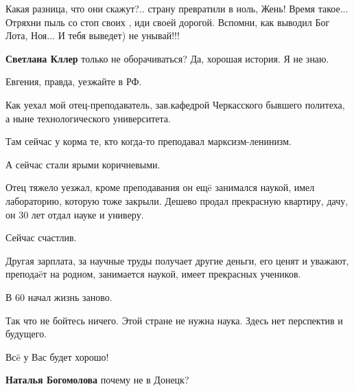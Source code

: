 \begin{itemize}
\begin{itemize}
Какая разница, что они скажут?.. страну превратили в ноль, Жень! Время такое...
Отряхни пыль со стоп своих , иди своей дорогой. Вспомни, как выводил Бог Лота,
Ноя... И тебя выведет) не унывай!!!

 
\textbf{Светлана Кллер} только не оборачиваться? Да, хорошая история. Я не знаю.
\end{itemize}

 

Евгения, правда, уезжайте в РФ.

Как уехал мой отец-преподаватель, зав.кафедрой Черкасского бывшего политеха, а
ныне технологического университета.

Там сейчас у корма те, кто когда-то преподавал марксизм-ленинизм.

А сейчас стали ярыми коричневыми.

Отец тяжело уезжал, кроме преподавания он ещë занимался наукой, имел
лабораторию, которую тоже закрыли. Дешево продал прекрасную квартиру, дачу, он
30 лет отдал науке и универу.

Сейчас счастлив.

Другая зарплата, за научные труды получает другие деньги, его ценят и уважают,
преподаëт на родном, занимается наукой, имеет прекрасных учеников.

В 60 начал жизнь заново.

Так что не бойтесь ничего. Этой стране не нужна наука. Здесь нет перспектив и
будущего.

Всë у Вас будет хорошо!

\begin{itemize}
 
\textbf{Наталья Богомолова} почему не в Донецк?

 

\end{itemize}
\end{itemize}
